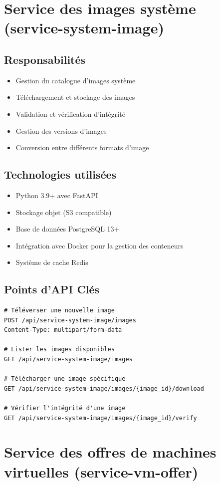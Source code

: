 \documentclass[12pt,a4paper]{report}
\begin{document}
\section{Service des images système (service-system-image)}
\subsection{Responsabilités}
\begin{itemize}
    \item Gestion du catalogue d'images système
    \item Téléchargement et stockage des images
    \item Validation et vérification d'intégrité
    \item Gestion des versions d'images
    \item Conversion entre différents formats d'image
\end{itemize}

\subsection{Technologies utilisées}
\begin{itemize}
    \item Python 3.9+ avec FastAPI
    \item Stockage objet (S3 compatible)
    \item Base de données PostgreSQL 13+
    \item Intégration avec Docker pour la gestion des conteneurs
    \item Système de cache Redis
\end{itemize}

\subsection{Points d'API Clés}
\begin{verbatim}
# Téléverser une nouvelle image
POST /api/service-system-image/images
Content-Type: multipart/form-data

# Lister les images disponibles
GET /api/service-system-image/images

# Télécharger une image spécifique
GET /api/service-system-image/images/{image_id}/download

# Vérifier l'intégrité d'une image
GET /api/service-system-image/images/{image_id}/verify
\end{verbatim}

\section{Service des offres de machines virtuelles (service-vm-offer)}
\end{document}
